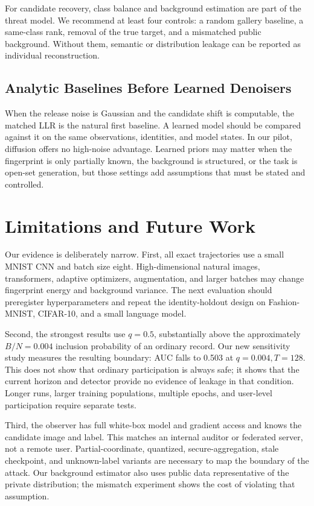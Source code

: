 \documentclass[conference]{IEEEtran}
\begin{document}
For candidate recovery, class balance and background estimation are part of the threat model. We recommend at least four controls: a random gallery baseline, a same-class rank, removal of the true target, and a mismatched public background. Without them, semantic or distribution leakage can be reported as individual reconstruction.

\subsection{Analytic Baselines Before Learned Denoisers}

When the release noise is Gaussian and the candidate shift is computable, the matched LLR is the natural first baseline. A learned model should be compared against it on the same observations, identities, and model states. In our pilot, diffusion offers no high-noise advantage. Learned priors may matter when the fingerprint is only partially known, the background is structured, or the task is open-set generation, but those settings add assumptions that must be stated and controlled.

\section{Limitations and Future Work}

Our evidence is deliberately narrow. First, all exact trajectories use a small MNIST CNN and batch size eight. High-dimensional natural images, transformers, adaptive optimizers, augmentation, and larger batches may change fingerprint energy and background variance. The next evaluation should preregister hyperparameters and repeat the identity-holdout design on Fashion-MNIST, CIFAR-10, and a small language model.

Second, the strongest results use $q=0.5$, substantially above the approximately $B/N=0.004$ inclusion probability of an ordinary record. Our new sensitivity study measures the resulting boundary: AUC falls to 0.503 at $q=0.004,T=128$. This does not show that ordinary participation is always safe; it shows that the current horizon and detector provide no evidence of leakage in that condition. Longer runs, larger training populations, multiple epochs, and user-level participation require separate tests.

Third, the observer has full white-box model and gradient access and knows the candidate image and label. This matches an internal auditor or federated server, not a remote user. Partial-coordinate, quantized, secure-aggregation, stale checkpoint, and unknown-label variants are necessary to map the boundary of the attack. Our background estimator also uses public data representative of the private distribution; the mismatch experiment shows the cost of violating that assumption.
\end{document}
